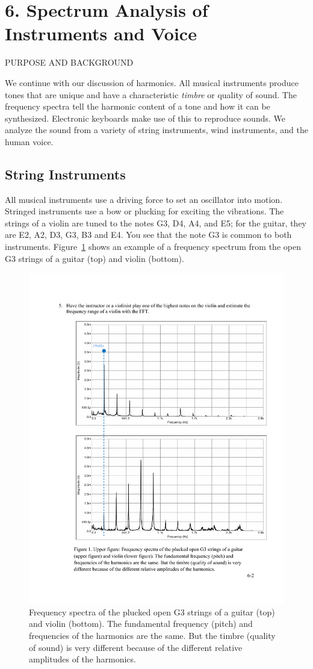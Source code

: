 \documentclass[11pt]{NSF}
\begin{document}
\section{6. Spectrum Analysis of Instruments and Voice}

PURPOSE AND BACKGROUND

We continue with our discussion of harmonics. 
All musical instruments produce tones that
are unique and have a characteristic {\em timbre} or quality of sound. The
frequency spectra tell the harmonic content of a tone and how it can
be synthesized. Electronic keyboards make use of this to reproduce
sounds. We analyze the sound from a variety of string instruments, 
wind instruments, and the human voice.

\subsection{String Instruments}

All musical instruments use a driving force to set an oscillator into
motion. Stringed instruments use a bow or plucking for exciting the
vibrations. 
The strings of a violin are tuned to the notes G3, D4, A4, and E5;
for the guitar, they are E2, A2, D3, G3, B3 and E4. You see that the
note G3 is common to both instruments. 
Figure~\ref{f:1} shows an example of a frequency spectrum from the 
open G3 strings of a guitar (top) and violin (bottom).
%
\begin{figure}[hbtp]
\begin{center}
\includegraphics[width=.6\textwidth]{fig6_1}
\caption{Frequency spectra of the plucked open G3 strings of a guitar
(top) and violin (bottom). The fundamental frequency
(pitch) and frequencies of the harmonics are the same. But the timbre
(quality of sound) is very different because of the different relative
amplitudes of the harmonics.}
\label{f:1}
\end{center}
\end{figure}
\end{document}
